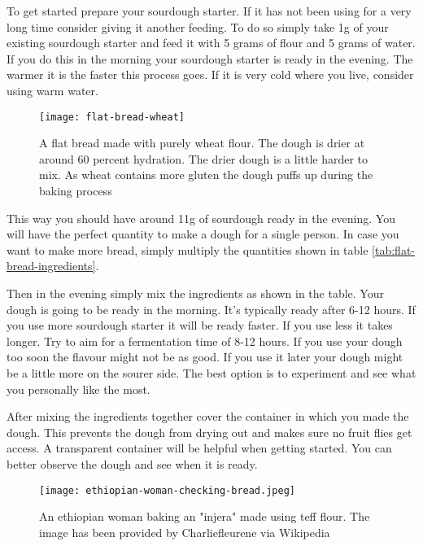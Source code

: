 To get started prepare your sourdough starter. If it has not been using for a very
long time consider giving it another feeding. To do so simply take 1g of your
existing sourdough starter and feed it with 5 grams of flour and 5 grams of water.
If you do this in the morning your sourdough starter is ready in the evening. The
warmer it is the faster this process goes. If it is very cold where you live, consider
using warm water.

\begin{figure}[htb!]
  \texttt{[image: flat-bread-wheat]}
  \centering
  \caption{A flat bread made with purely wheat flour. The dough is drier
  at around 60 percent hydration.  The drier dough is a little harder
  to mix. As wheat contains more gluten the dough puffs up during
  the baking process}
\end{figure}

This way you should have around 11g of sourdough ready in the evening. You will have
the perfect quantity to make a dough for a single person. In case you want to make more
bread, simply multiply the quantities shown in table \ref*{tab:flat-bread-ingredients}.

Then in the evening simply mix the ingredients as shown in the table. Your dough
is going to be ready in the morning. It's typically ready after 6-12 hours. If
you use more sourdough starter it will be ready faster. If you use less it takes
longer. Try to aim for a fermentation time of 8-12 hours. If you use
your dough too soon the flavour might not be as good. If you use it later
your dough might be a little more on the sourer side. The best option is to experiment
and see what you personally like the most.

After mixing the ingredients together cover the container in which
you made the dough. This prevents the dough from drying out and makes
sure no fruit flies get access. A transparent container will be helpful
when getting started. You can better observe the dough and see when
it is ready.

\begin{figure}[htb!]
  \texttt{[image: ethiopian-woman-checking-bread.jpeg]}
  \centering
  \caption{An ethiopian woman baking an "injera" made using teff flour. 
  The image has been provided by Charliefleurene via Wikipedia}
\end{figure}

